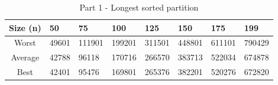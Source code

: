 \begin{table}[h!]
\begin{center}
\begin{tabular}{|c|m{0.80cm}|m{0.80cm}|m{0.80cm}|m{0.80cm}|m{0.80cm}|m{0.80cm}|m{1cm}|} 
 \hline
 Size (n) & 50 & 75 & 100 & 125 & 150 & 175 & 199 \\
 \hline\hline
 Worst & 49601 & 111901 & 199201 & 311501 & 448801 & 611101 & 790429 \\
 \hline
 Average & 42788 & 96118 & 170716 & 266570 & 383713 & 522034 & 674878 \\
 \hline
 Best & 42401 & 95476 & 169801 & 265376 & 382201 & 520276 & 672820 \\
 \hline
\end{tabular}
\label{partition_table}
\caption{Part 1 - Longest sorted partition}
\end{center}
\end{table}
